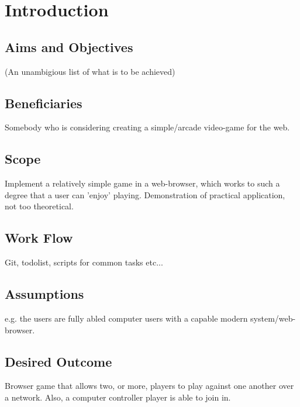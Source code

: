 \documentclass{standalone}
\begin{document}
	\section{Introduction}
		\subsection{Aims and Objectives}
			(An unambigious list of what is to be achieved)

		\subsection{Beneficiaries}
			Somebody who is considering creating a simple/arcade video-game for the web.

		\subsection{Scope}
			Implement a relatively simple game in a web-browser, which works to such a degree that a user can 'enjoy' playing. Demonstration of practical application, not too theoretical.

		\subsection{Work Flow}
			Git, todolist, scripts for common tasks etc...

		\subsection{Assumptions}
			e.g. the users are fully abled computer users with a capable modern system/web-browser.

		\subsection{Desired Outcome}
			Browser game that allows two, or more, players to play against one another over a network. Also, a computer controller player is able to join in.
\end{document}
